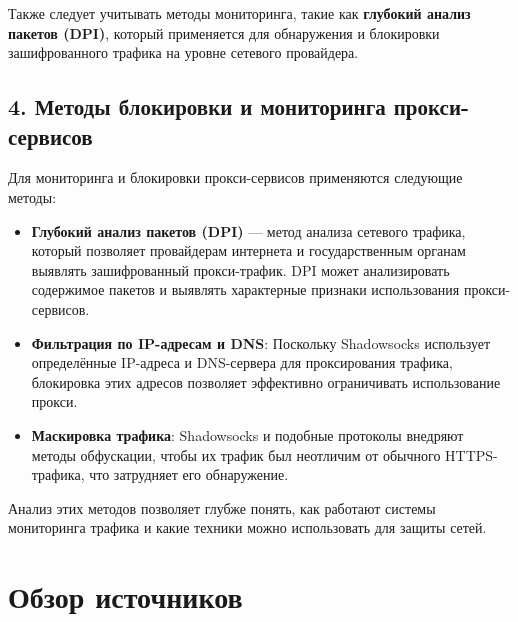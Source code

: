 \documentclass[a4paper,12pt]{article}
\begin{document}
Также следует учитывать методы мониторинга, такие как \textbf{глубокий анализ пакетов (DPI)}, который применяется для обнаружения и блокировки зашифрованного трафика на уровне сетевого провайдера.

\subsection*{4. Методы блокировки и мониторинга прокси-сервисов}

Для мониторинга и блокировки прокси-сервисов применяются следующие методы:

\begin{itemize}
    \item \textbf{Глубокий анализ пакетов (DPI)} --- метод анализа сетевого трафика, который позволяет провайдерам интернета и государственным органам выявлять зашифрованный прокси-трафик. DPI может анализировать содержимое пакетов и выявлять характерные признаки использования прокси-сервисов.
    \item \textbf{Фильтрация по IP-адресам и DNS}: Поскольку Shadowsocks использует определённые IP-адреса и DNS-сервера для проксирования трафика, блокировка этих адресов позволяет эффективно ограничивать использование прокси.
    \item \textbf{Маскировка трафика}: Shadowsocks и подобные протоколы внедряют методы обфускации, чтобы их трафик был неотличим от обычного HTTPS-трафика, что затрудняет его обнаружение.
\end{itemize}

Анализ этих методов позволяет глубже понять, как работают системы мониторинга трафика и какие техники можно использовать для защиты сетей.

\newpage

\section*{Обзор источников}
\end{document}
